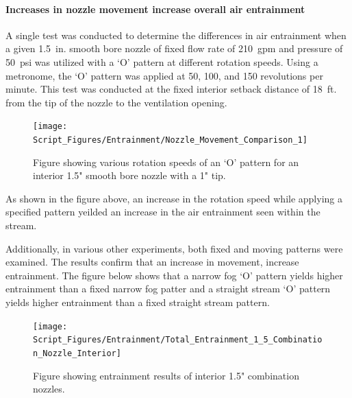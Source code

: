 \documentclass{article}
\begin{document}


\paragraph{Increases in nozzle movement increase overall air entrainment}

A single test was conducted to determine the differences in air entrainment when a given 1.5~in. smooth bore nozzle of fixed flow rate of 210~gpm and pressure of 50~psi was utilized with a `O' pattern at different rotation speeds. Using a metronome, the `O' pattern was applied at 50, 100, and 150 revolutions per minute. This test was conducted at the fixed interior setback distance of 18~ft. from the tip of the nozzle to the ventilation opening.

\begin{figure}[!ht]
	\centering
	\texttt{[image: Script\_Figures/Entrainment/Nozzle\_Movement\_Comparison\_1]}
	\caption{Figure showing various rotation speeds of an `O' pattern for an interior 1.5" smooth bore nozzle with a 1" tip.}
	\label{fig:1_5_Interior_Nozzle_Movement_RotationSpeed_Comparison}
\end{figure}

As shown in the figure above, an increase in the rotation speed while applying a specified pattern yeilded an increase in the air entrainment seen within the stream.

\clearpage

Additionally, in various other experiments, both fixed and moving patterns were examined. The results confirm that an increase in movement, increase entrainment. The figure below shows that a narrow fog `O' pattern yields higher entrainment than a fixed narrow fog patter and a straight stream `O' pattern yields higher entrainment than a fixed straight stream pattern.

\begin{figure}[!ht]
	\centering
	\texttt{[image: Script\_Figures/Entrainment/Total\_Entrainment\_1\_5\_Combination\_Nozzle\_Interior]}
	\caption{Figure showing entrainment results of interior 1.5" combination nozzles.}
	\label{fig:1_5_Interior_Combination_Results_Nozzle_Movements}
\end{figure}
\end{document}
